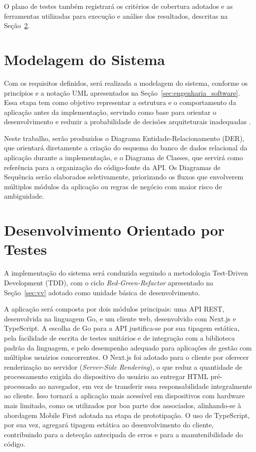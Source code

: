 O plano de testes também registrará os critérios de cobertura adotados e as ferramentas utilizadas para execução e análise dos resultados, descritas na Seção~\ref{sec:desenvolvimento}.


\section{Modelagem do Sistema}

Com os requisitos definidos, será realizada a modelagem do sistema, conforme os princípios e a notação UML apresentados na Seção~\ref{sec:engenharia_software}. Essa etapa tem como objetivo representar a estrutura e o comportamento da aplicação antes da implementação, servindo como base para orientar o desenvolvimento e reduzir a probabilidade de decisões arquiteturais inadequadas \cite{sommerville2019}.

Neste trabalho, serão produzidos o Diagrama Entidade-Relacionamento (DER), que orientará diretamente a criação do esquema do banco de dados relacional da aplicação durante a implementação, e o Diagrama de Classes, que servirá como referência para a organização do código-fonte da API. Os Diagramas de Sequência serão elaborados seletivamente, priorizando os fluxos que envolverem múltiplos módulos da aplicação ou regras de negócio com maior risco de ambiguidade.


\section{Desenvolvimento Orientado por Testes}
\label{sec:desenvolvimento}

A implementação do sistema será conduzida seguindo a metodologia {Test-Driven Development (TDD)}, com o ciclo \textit{Red-Green-Refactor} apresentado na Seção~\ref{sec:vv} adotado como unidade básica de desenvolvimento.

A aplicação será composta por dois módulos principais: uma API REST, desenvolvida na linguagem Go, e um cliente web, desenvolvido com Next.js e TypeScript. A escolha de Go para a API justifica-se por sua tipagem estática, pela facilidade de escrita de testes unitários e de integração com a biblioteca padrão da linguagem, e pelo desempenho adequado para aplicações de gestão com múltiplos usuários concorrentes. O Next.js foi adotado para o cliente por oferecer renderização no servidor (\textit{Server-Side Rendering}), o que reduz a quantidade de processamento exigida do dispositivo do usuário ao entregar HTML pré-processado ao navegador, em vez de transferir essa responsabilidade integralmente ao cliente. Isso tornará a aplicação mais acessível em dispositivos com hardware mais limitado, como os utilizados por boa parte dos associados, alinhando-se à abordagem Mobile First adotada na etapa de prototipação. O uso de TypeScript, por sua vez, agregará tipagem estática ao desenvolvimento do cliente, contribuindo para a detecção antecipada de erros e para a manutenibilidade do código.

